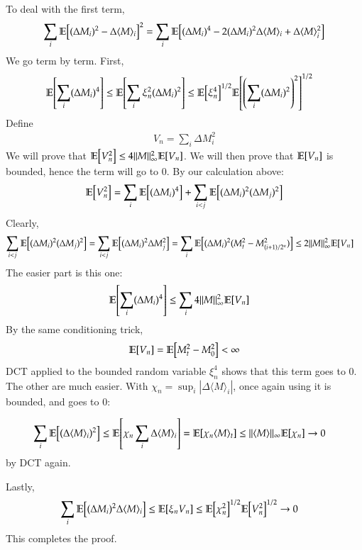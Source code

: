 \documentclass[12pt]{article}
\theoremstyle{definitionstyle}
\newcommand{\mg}[1]{\| #1 \|}
\newcommand{\1}{\mathds 1}
\newcommand{\E}{\mathbb E \qty}
\newcommand{\qv}[1]{\langle #1 \rangle}
\begin{document}
    To deal with the first term,
    \begin{align*}
        \sum_i \E [(\Delta M_i)^2 - \Delta \qv{M}_i]^2 = \sum_i \E[(\Delta M_i)^4 - 2 (\Delta M_i)^2 \Delta \qv{M}_i + \Delta \qv{M}_i^2]
    \end{align*}
    We go term by term. First,
    \begin{align*}
         \E[\sum_i (\Delta M_i)^4] &\leq  \E[\sum_i \xi_n^2 (\Delta M_i)^2] \leq \E[\xi_n^4]^{1/2} \E[\qty(\sum_i (\Delta M_i)^2)^2]^{1/2}
    \end{align*}
    Define 
    \begin{align*}
        V_n = \sum_i \Delta M_i^2
    \end{align*}
    We will prove that $\E[V_n^2] \leq 4\mg{M}_\infty^2 \E[V_n]$. We will then prove that $\E[V_n]$ is bounded, hence the term will go to 0. By our calculation above:
    \begin{align*}
        \E[V_n^2] = \sum_i \E[(\Delta M_i)^4] + \sum_{i<j} \E[(\Delta M_i)^2 (\Delta M_j)^2]
    \end{align*}
    Clearly,
    \begin{align*}
        \sum_{i < j} \E[(\Delta M_i)^2 (\Delta M_j)^2] &= \sum_{i < j} \E[(\Delta M_i)^2 \Delta M_j^2] = \sum_i \E[(\Delta M_i)^2 (M_t^2 - M_{(i+1)/2^n}^2)] \leq 2\mg{M}_\infty^2 \E[V_n]
    \end{align*}
    The easier part is this one:
    \begin{align*}
        \E[\sum_i (\Delta M_i)^4] &\leq \sum_i 4\mg{M}_\infty^2 \E[V_n]
    \end{align*}
    By the same conditioning trick,
    \begin{align*}
        \E[V_n] = \E[M_t^2 - M_0^2] < \infty
    \end{align*}
    DCT applied to the bounded random variable $\xi_n^4$ shows that this term goes to 0. The other are much easier. With $\chi_n = \sup_i |\Delta \qv{M}_i|$, once again using it is bounded, and goes to 0:

    \begin{align*}
        \sum_i \E[(\Delta \qv{M}_i)^2] &\leq \E[\chi_n \sum_i \Delta \qv{M}_i] = \E[\chi_n \qv{M}_t] \leq \mg{\qv{M}}_\infty \E[\chi_n] \to 0
    \end{align*}
    by DCT again.

    Lastly,
    \begin{align*}
        \sum_i \E[(\Delta M_i)^2 \Delta \qv{M}_i] &\leq \E[\xi_n V_n] \leq \E[\chi_n^2]^{1/2} \E[V_n^2]^{1/2} \to 0
    \end{align*}
    This completes the proof. 
\end{document}
